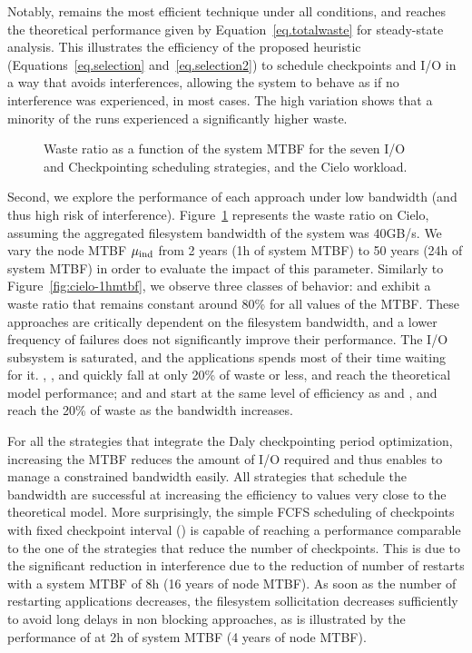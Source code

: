 Notably, \cooperative remains the most efficient technique under all
conditions, and reaches the theoretical performance given by
Equation~\eqref{eq.totalwaste} for steady-state
analysis. This illustrates the efficiency of the proposed heuristic
(Equations~\eqref{eq.selection} and~\eqref{eq.selection2}) to
schedule checkpoints and I/O in a way that avoids interferences,
allowing the system to behave as if no interference was experienced,
in most cases. The high variation shows that a minority of the runs
experienced a significantly higher waste.

\begin{figure}
  \begin{center}
    \resizebox{\linewidth}{!}{}
  \end{center}
  \caption{Waste ratio as a function of the system MTBF for the
    seven I/O and Checkpointing scheduling strategies, and the Cielo
    workload. \label{fig:cielo-40gbs}}
\end{figure}

Second, we explore the performance of each approach under low
bandwidth (and thus high risk of
interference). Figure~\ref{fig:cielo-40gbs} represents the waste ratio
on Cielo, assuming the aggregated filesystem bandwidth of the system
was 40GB/s. We vary the node MTBF $\mu_{\text{ind}}$ 
from 2 years (1h of system MTBF) to 50 years (24h of system MTBF) 
in order to evaluate the impact of this
parameter. Similarly to Figure~\ref{fig:cielo-1hmtbf}, we observe three
classes of behavior: \propfixed and \bfifofixed exhibit a waste ratio
that remains constant around 80\% for all values of the MTBF. These
approaches are critically dependent on the filesystem bandwidth, and a
lower frequency of failures does not significantly improve their
performance. The I/O subsystem is saturated, and the applications
spends most of their time waiting for it. \fifodaly, \fifofixed, and
\cooperative quickly fall at only 20\% of waste or less, and reach
the theoretical model performance; and \propdaly and \bfifodaly start
at the same level of efficiency as \propfixed and \bfifofixed, and
reach the 20\% of waste as the bandwidth increases.

For all the strategies that integrate the Daly checkpointing period
optimization, increasing the MTBF reduces the amount of I/O required
and thus enables to manage a constrained bandwidth easily. All
strategies that schedule the bandwidth are successful at increasing the
efficiency to values very close to the theoretical model. More
surprisingly, the simple FCFS scheduling of checkpoints with fixed
checkpoint interval (\bfifofixed) is capable of reaching a performance
comparable to the one of the strategies that reduce the number of
checkpoints. This is due to the significant reduction in interference
due to the reduction of number of restarts with a system MTBF of 8h
(16 years of node MTBF). As soon as the number of restarting
applications decreases, the filesystem sollicitation decreases
sufficiently to avoid long delays in non blocking approaches, as is
illustrated by the performance of \fifofixed at 2h of system MTBF (4
years of node MTBF).

